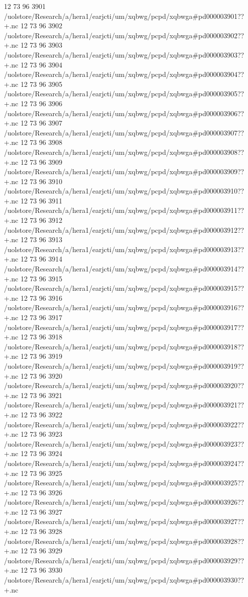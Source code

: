 12 73 96
3901
/uolstore/Research/a/hera1/earjcti/um/xqbwg/pcpd/xqbwga#pd000003901??+.nc
12 73 96
3902
/uolstore/Research/a/hera1/earjcti/um/xqbwg/pcpd/xqbwga#pd000003902??+.nc
12 73 96
3903
/uolstore/Research/a/hera1/earjcti/um/xqbwg/pcpd/xqbwga#pd000003903??+.nc
12 73 96
3904
/uolstore/Research/a/hera1/earjcti/um/xqbwg/pcpd/xqbwga#pd000003904??+.nc
12 73 96
3905
/uolstore/Research/a/hera1/earjcti/um/xqbwg/pcpd/xqbwga#pd000003905??+.nc
12 73 96
3906
/uolstore/Research/a/hera1/earjcti/um/xqbwg/pcpd/xqbwga#pd000003906??+.nc
12 73 96
3907
/uolstore/Research/a/hera1/earjcti/um/xqbwg/pcpd/xqbwga#pd000003907??+.nc
12 73 96
3908
/uolstore/Research/a/hera1/earjcti/um/xqbwg/pcpd/xqbwga#pd000003908??+.nc
12 73 96
3909
/uolstore/Research/a/hera1/earjcti/um/xqbwg/pcpd/xqbwga#pd000003909??+.nc
12 73 96
3910
/uolstore/Research/a/hera1/earjcti/um/xqbwg/pcpd/xqbwga#pd000003910??+.nc
12 73 96
3911
/uolstore/Research/a/hera1/earjcti/um/xqbwg/pcpd/xqbwga#pd000003911??+.nc
12 73 96
3912
/uolstore/Research/a/hera1/earjcti/um/xqbwg/pcpd/xqbwga#pd000003912??+.nc
12 73 96
3913
/uolstore/Research/a/hera1/earjcti/um/xqbwg/pcpd/xqbwga#pd000003913??+.nc
12 73 96
3914
/uolstore/Research/a/hera1/earjcti/um/xqbwg/pcpd/xqbwga#pd000003914??+.nc
12 73 96
3915
/uolstore/Research/a/hera1/earjcti/um/xqbwg/pcpd/xqbwga#pd000003915??+.nc
12 73 96
3916
/uolstore/Research/a/hera1/earjcti/um/xqbwg/pcpd/xqbwga#pd000003916??+.nc
12 73 96
3917
/uolstore/Research/a/hera1/earjcti/um/xqbwg/pcpd/xqbwga#pd000003917??+.nc
12 73 96
3918
/uolstore/Research/a/hera1/earjcti/um/xqbwg/pcpd/xqbwga#pd000003918??+.nc
12 73 96
3919
/uolstore/Research/a/hera1/earjcti/um/xqbwg/pcpd/xqbwga#pd000003919??+.nc
12 73 96
3920
/uolstore/Research/a/hera1/earjcti/um/xqbwg/pcpd/xqbwga#pd000003920??+.nc
12 73 96
3921
/uolstore/Research/a/hera1/earjcti/um/xqbwg/pcpd/xqbwga#pd000003921??+.nc
12 73 96
3922
/uolstore/Research/a/hera1/earjcti/um/xqbwg/pcpd/xqbwga#pd000003922??+.nc
12 73 96
3923
/uolstore/Research/a/hera1/earjcti/um/xqbwg/pcpd/xqbwga#pd000003923??+.nc
12 73 96
3924
/uolstore/Research/a/hera1/earjcti/um/xqbwg/pcpd/xqbwga#pd000003924??+.nc
12 73 96
3925
/uolstore/Research/a/hera1/earjcti/um/xqbwg/pcpd/xqbwga#pd000003925??+.nc
12 73 96
3926
/uolstore/Research/a/hera1/earjcti/um/xqbwg/pcpd/xqbwga#pd000003926??+.nc
12 73 96
3927
/uolstore/Research/a/hera1/earjcti/um/xqbwg/pcpd/xqbwga#pd000003927??+.nc
12 73 96
3928
/uolstore/Research/a/hera1/earjcti/um/xqbwg/pcpd/xqbwga#pd000003928??+.nc
12 73 96
3929
/uolstore/Research/a/hera1/earjcti/um/xqbwg/pcpd/xqbwga#pd000003929??+.nc
12 73 96
3930
/uolstore/Research/a/hera1/earjcti/um/xqbwg/pcpd/xqbwga#pd000003930??+.nc

